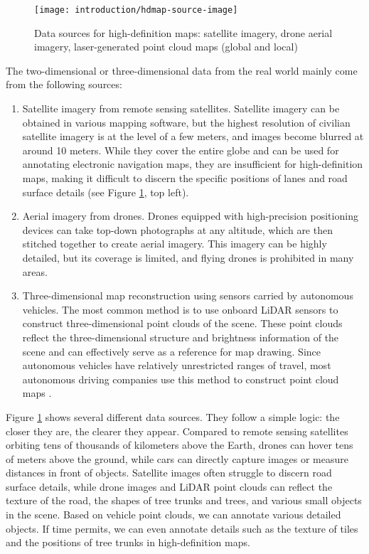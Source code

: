 \begin{figure}[!t]
	\centering
	\texttt{[image: introduction/hdmap-source-image]}
	\caption{Data sources for high-definition maps: satellite imagery, drone aerial imagery, laser-generated point cloud maps (global and local)}
	\label{fig:hdmap-source}
\end{figure}

The two-dimensional or three-dimensional data from the real world mainly come from the following sources:

\begin{enumerate}
	\item Satellite imagery from remote sensing satellites. Satellite imagery can be obtained in various mapping software, but the highest resolution of civilian satellite imagery is at the level of a few meters, and images become blurred at around 10 meters. While they cover the entire globe and can be used for annotating electronic navigation maps, they are insufficient for high-definition maps, making it difficult to discern the specific positions of lanes and road surface details (see Figure \ref{fig:hdmap-source}, top left).
	\item Aerial imagery from drones. Drones equipped with high-precision positioning devices can take top-down photographs at any altitude, which are then stitched together to create aerial imagery. This imagery can be highly detailed, but its coverage is limited, and flying drones is prohibited in many areas.
	\item Three-dimensional map reconstruction using sensors carried by autonomous vehicles. The most common method is to use onboard LiDAR sensors to construct three-dimensional point clouds of the scene. These point clouds reflect the three-dimensional structure and brightness information of the scene and can effectively serve as a reference for map drawing. Since autonomous vehicles have relatively unrestricted ranges of travel, most autonomous driving companies use this method to construct point cloud maps \cite{Ghallabi2019, Ma2019}.
\end{enumerate}

Figure \ref{fig:hdmap-source} shows several different data sources. They follow a simple logic: the closer they are, the clearer they appear. Compared to remote sensing satellites orbiting tens of thousands of kilometers above the Earth, drones can hover tens of meters above the ground, while cars can directly capture images or measure distances in front of objects. Satellite images often struggle to discern road surface details, while drone images and LiDAR point clouds can reflect the texture of the road, the shapes of tree trunks and trees, and various small objects in the scene. Based on vehicle point clouds, we can annotate various detailed objects. If time permits, we can even annotate details such as the texture of tiles and the positions of tree trunks in high-definition maps.

